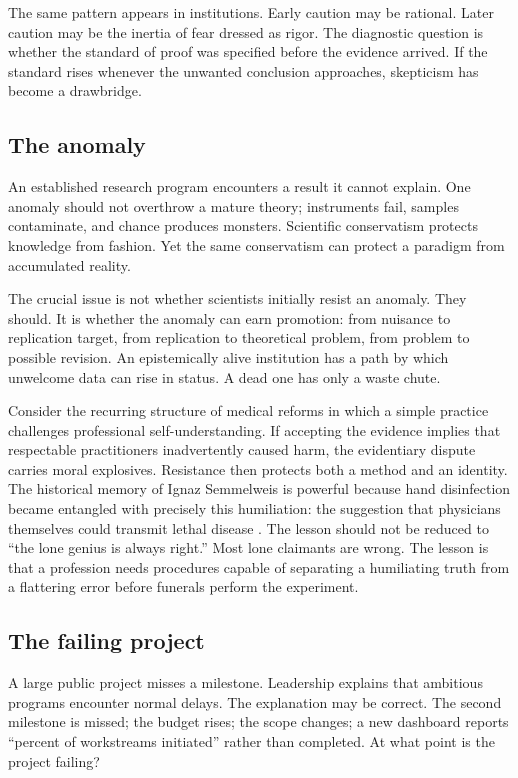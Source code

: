 ﻿\documentclass[12pt,a4paper]{book}
\begin{document}
The same pattern appears in institutions. Early caution may be rational. Later caution may be the inertia of fear dressed as rigor. The diagnostic question is whether the standard of proof was specified before the evidence arrived. If the standard rises whenever the unwanted conclusion approaches, skepticism has become a drawbridge.

\subsection{The anomaly}

An established research program encounters a result it cannot explain. One anomaly should not overthrow a mature theory; instruments fail, samples contaminate, and chance produces monsters. Scientific conservatism protects knowledge from fashion. Yet the same conservatism can protect a paradigm from accumulated reality.

The crucial issue is not whether scientists initially resist an anomaly. They should. It is whether the anomaly can earn promotion: from nuisance to replication target, from replication to theoretical problem, from problem to possible revision. An epistemically alive institution has a path by which unwelcome data can rise in status. A dead one has only a waste chute.

Consider the recurring structure of medical reforms in which a simple practice challenges professional self-understanding. If accepting the evidence implies that respectable practitioners inadvertently caused harm, the evidentiary dispute carries moral explosives. Resistance then protects both a method and an identity. The historical memory of Ignaz Semmelweis is powerful because hand disinfection became entangled with precisely this humiliation: the suggestion that physicians themselves could transmit lethal disease \cite{semmelweis2024}. The lesson should not be reduced to “the lone genius is always right.” Most lone claimants are wrong. The lesson is that a profession needs procedures capable of separating a humiliating truth from a flattering error before funerals perform the experiment.

\subsection{The failing project}

A large public project misses a milestone. Leadership explains that ambitious programs encounter normal delays. The explanation may be correct. The second milestone is missed; the budget rises; the scope changes; a new dashboard reports “percent of workstreams initiated” rather than completed. At what point is the project failing?
\end{document}
